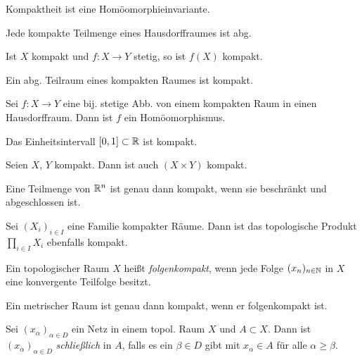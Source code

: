 \documentclass{cheat-sheet}
\begin{document}
\begin{bem}
  Kompaktheit ist eine Homöomorphieinvariante.
\end{bem}

\begin{prop}
  Jede kompakte Teilmenge eines Hausdorffraumes ist abg.
\end{prop}

\begin{prop}
  Ist $X$ kompakt und $f : X \to Y$ stetig, so ist $f(X)$ kompakt.
\end{prop}

\begin{prop}
  Ein abg. Teilraum eines kompakten Raumes ist kompakt.
\end{prop}

\begin{prop}
  Sei $f : X \to Y$ eine bij. stetige Abb. von einem kompakten Raum in einen Hausdorffraum. Dann ist $f$ ein Homöomorphismus.
\end{prop}


\begin{prop}
  Das Einheitsintervall $\left[ 0, 1 \right] \subset \mathbb{R}$ ist kompakt.
\end{prop}

\begin{prop}
  Seien $X$, $Y$ kompakt. Dann ist auch $(X \times Y)$ kompakt.
\end{prop}

\begin{satz}
  Eine Teilmenge von $\mathbb{R}^n$ ist genau dann kompakt, wenn sie beschränkt und abgeschlossen ist.
\end{satz}

\begin{satz}
  Sei $(X_i)_{i \in I}$ eine Familie kompakter Räume. Dann ist das topologische Produkt $\prod_{i \in I} X_i$ ebenfalls kompakt.
\end{satz}

\begin{defn}
  Ein topologischer Raum $X$ heißt \emph{folgenkompakt}, wenn jede Folge $(x_n)_{n \in \mathbb{N}}$ in $X$ eine konvergente Teilfolge besitzt.
\end{defn}

\begin{prop}
  Ein metrischer Raum ist genau dann kompakt, wenn er folgenkompakt ist.
\end{prop}

\begin{defn}
  Sei $(x_\alpha)_{\alpha \in D}$ ein Netz in einem topol. Raum $X$ und $A \subset X$. Dann ist $(x_\alpha)_{\alpha \in D}$ \emph{schließlich} in $A$, falls es ein $\beta \in D$ gibt mit $x_\alpha \in A$ für alle $\alpha \geq \beta$.
\end{defn}
\end{document}
